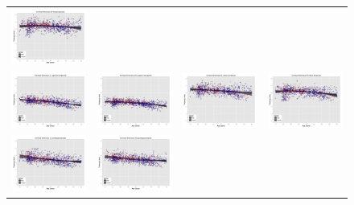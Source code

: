 \begin{figure}
\begin{tabular}{cccc}
  \includegraphics[width=35mm]{Figures/label8_results.pdf} \\
  \includegraphics[width=35mm]{Figures/label9_results.pdf} &
  \includegraphics[width=35mm]{Figures/label10_results.pdf} &
  \includegraphics[width=35mm]{Figures/label11_results.pdf} &
  \includegraphics[width=35mm]{Figures/label12_results.pdf} \\
  \includegraphics[width=35mm]{Figures/label13_results.pdf} &
  \includegraphics[width=35mm]{Figures/label14_results.pdf} &

\end{tabular}
\end{figure}
